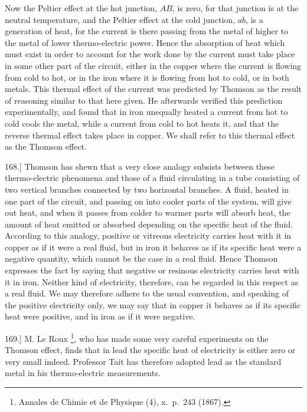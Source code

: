 \documentclass[12pt,oneside]{book}[2021/10/04]
\let\oldfootnote\footnote
\renewcommand\footnote[1]{%
\oldfootnote{\hspace{0.14em}#1}}
\newcommand{\Runhead}[1]{\fancyhead[C]{\iffloatpage{}{\small#1}}}
\newcommand{\article}[1]{\phantomsection \label{art:#1}{#1.]}}
\newcommand{\¬}{\hphantom{0}}
\begin{document}
Now the Peltier effect at the hot junction, \(AB\), is zero, for that
junction is at the neutral temperature, and the Peltier effect at the
cold junction, \(ab\), is a generation of heat, for the current is there
passing from the metal of
higher to the metal of lower
thermo-electric power. Hence
the absorption of heat which
must exist in order to account
for the work done by the current
must take place in some
other part of the circuit, either
in the copper where the current
is flowing from cold to hot, or in the iron where it is flowing
from hot to cold, or in both metals. This thermal effect of the
current was predicted by Thomson as the result of reasoning
similar to that here given. He afterwards verified this prediction
experimentally, and found that in iron unequally heated
a current from hot to cold cools the metal, while a current from
cold to hot heats it, and that the reverse thermal effect takes
place in copper. We shall refer to this thermal effect as the
Thomson effect.
\Runhead{THOMSON EFFECT.}

\article{168} Thomson has shewn that a very close analogy subsists between
these thermo-electric phenomena and those of a fluid circulating
in a tube consisting of two vertical branches connected by
two horizontal branches. A fluid, heated in one part of the circuit,
and passing on into cooler parts of the system, will give out heat,
and when it passes from colder to warmer parts will absorb heat,
the amount of heat emitted or absorbed depending on the specific
heat of the fluid. According to this analogy, positive or vitreous
electricity carries heat with it in copper as if it were a real fluid,
but in iron it behaves as if its specific heat were a negative quantity,
which cannot be the case in a real fluid. Hence Thomson
expresses the fact by saying that negative or resinous electricity
carries heat with it in iron. Neither kind of electricity, therefore,
can be regarded in this respect as a real fluid. We may therefore
adhere to the usual convention, and speaking of the positive electricity
only, we may say that in copper it behaves as if its specific
heat were positive, and in iron as if it were negative.

\article{169} M. Le Roux\footnote{
Annales de Chimie et de Physique (4), x.\ p.\ 243 (1867).}, who has made some very careful experiments
on the Thomson effect, finds that in lead the specific heat of
electricity is either zero or very small indeed. Professor Tait has
therefore adopted lead as the standard metal in his thermo-electric
measurements.
\end{document}
